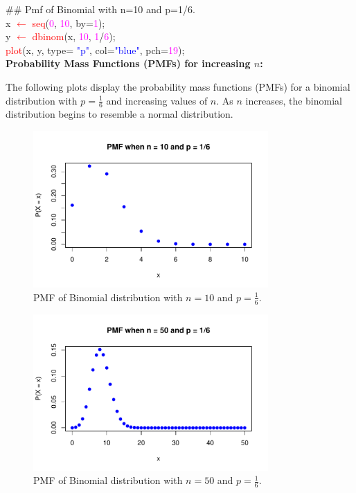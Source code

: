{\ttfamily
\textcolor{violet!70!black}{\#\# Pmf of Binomial with n=10 and p=1/6.} \\

x \textcolor{red}{$\leftarrow$} \textcolor{red}{seq}(\textcolor{magenta}{0}, \textcolor{magenta}{10}, \textcolor{green!50!black}{by}=\textcolor{magenta}{1}); \\
y \textcolor{red}{$\leftarrow$} \textcolor{red}{dbinom}(x, \textcolor{magenta}{10}, \textcolor{magenta}{1}\textcolor{black}{/}\textcolor{magenta}{6}); \\

\textcolor{red}{plot}(x, y, \textcolor{green!50!black}{type}= \textcolor{blue}{"p"}, \textcolor{green!50!black}{col}=\textcolor{blue}{"blue"}, \textcolor{green!50!black}{pch}=\textcolor{magenta}{19});
}\\


\textbf{Probability Mass Functions (PMFs) for increasing \(n\):}

\vspace{0.5em}

The following plots display the probability mass functions (PMFs) for a binomial distribution with \( p = \frac{1}{6} \) and increasing values of \( n \). As \( n \) increases, the binomial distribution begins to resemble a normal distribution.


\begin{figure}[h!]
  \centering
 \includegraphics[width=0.8\textwidth]{Section4/images/pmf_plot.pdf}
 \caption{PMF of Binomial distribution with \(n = 10\) and \(p = \frac{1}{6}\).}
\end{figure}

\begin{figure}[h!]
  \centering
  \includegraphics[width=0.8\textwidth]{Section4/images/pmf_n50.pdf}
  \caption{PMF of Binomial distribution with \(n = 50\) and \(p = \frac{1}{6}\).}
\end{figure}

